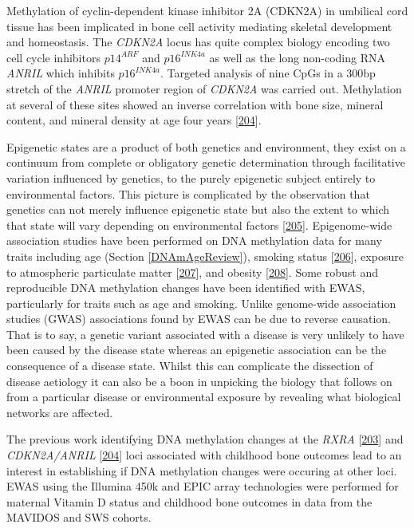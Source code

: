 \documentclass[
]{book}
\begin{document}
Methylation of cyclin-dependent kinase inhibitor 2A (CDKN2A) in umbilical cord tissue has been implicated in bone cell activity mediating skeletal development and homeostasis.
The \emph{CDKN2A} locus has quite complex biology encoding two cell cycle inhibitors \(p14^{ARF}\) and \(p16^{INK4a}\) as well as the long non-coding RNA \emph{ANRIL} which inhibits \(p16^{INK4a}\).
Targeted analysis of nine CpGs in a 300bp stretch of the \emph{ANRIL} promoter region of \emph{CDKN2A} was carried out.
Methylation at several of these sites showed an inverse correlation with bone size, mineral content, and mineral density at age four years {[}\protect\hyperlink{ref-Curtis2017}{204}{]}.

Epigenetic states are a product of both genetics and environment, they exist on a continuum from complete or obligatory genetic determination through facilitative variation influenced by genetics, to the purely epigenetic subject entirely to environmental factors.
This picture is complicated by the observation that genetics can not merely influence epigenetic state but also the extent to which that state will vary depending on environmental factors {[}\protect\hyperlink{ref-Holland2017}{205}{]}.
Epigenome-wide association studies have been performed on DNA methylation data for many traits including age (Section \ref{DNAmAgeReview}), smoking status {[}\protect\hyperlink{ref-Dogan2017}{206}{]}, exposure to atmospheric particulate matter {[}\protect\hyperlink{ref-Dai2016}{207}{]}, and obesity {[}\protect\hyperlink{ref-Wahl2016}{208}{]}.
Some robust and reproducible DNA methylation changes have been identified with EWAS, particularly for traits such as age and smoking.
Unlike genome-wide association studies (GWAS) associations found by EWAS can be due to reverse causation.
That is to say, a genetic variant associated with a disease is very unlikely to have been caused by the disease state whereas an epigenetic association can be the consequence of a disease state.
Whilst this can complicate the dissection of disease aetiology it can also be a boon in unpicking the biology that follows on from a particular disease or environmental exposure by revealing what biological networks are affected.

The previous work identifying DNA methylation changes at the \emph{RXRA} {[}\protect\hyperlink{ref-Harvey2014d}{203}{]} and \emph{CDKN2A/ANRIL} {[}\protect\hyperlink{ref-Curtis2017}{204}{]} loci associated with childhood bone outcomes lead to an interest in establishing if DNA methylation changes were occuring at other loci.
EWAS using the Illumina 450k and EPIC array technologies were performed for maternal Vitamin D status and childhood bone outcomes in data from the MAVIDOS and SWS cohorts.
\end{document}
